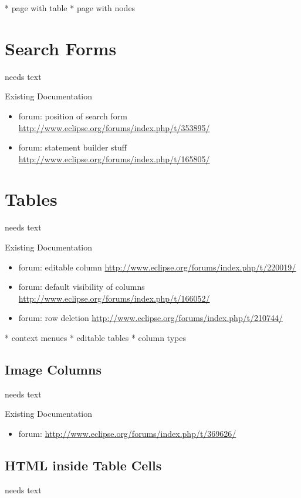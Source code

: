 \documentclass[a4paper,10pt,twoside]{book}
\begin{document}
    * page with table
	* page with nodes

	
\section{Search Forms}
needs text

\noindent Existing Documentation
\begin{itemize}
  \item forum: position of search form \url{http://www.eclipse.org/forums/index.php/t/353895/}
  \item forum: statement builder stuff \url{http://www.eclipse.org/forums/index.php/t/165805/}
\end{itemize}
	
\section{Tables}
needs text

\noindent Existing Documentation
\begin{itemize}
  \item forum: editable column \url{http://www.eclipse.org/forums/index.php/t/220019/}
  \item forum: default visibility of columns \url{http://www.eclipse.org/forums/index.php/t/166052/}
  \item forum: row deletion \url{http://www.eclipse.org/forums/index.php/t/210744/}
\end{itemize}

	* context menues
	* editable tables
    * column types

\subsection{Image Columns}
needs text

\noindent Existing Documentation
\begin{itemize}
  \item forum: \url{http://www.eclipse.org/forums/index.php/t/369626/}
\end{itemize}

\subsection{HTML inside Table Cells}
needs text
\end{document}

